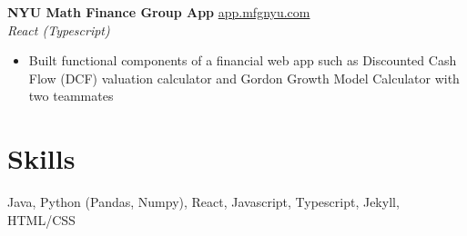 \documentclass[margin]{res}
\begin{document}
\begin{resume}
	{\bf NYU Math Finance Group App} \hfill\href{https://github.com/mfg-nyu/app}{app.mfgnyu.com}\\
	{\it React (Typescript)}
	\begin{itemize} \itemsep -2pt
		\item Built functional components of a financial web app such as Discounted Cash Flow (DCF) valuation calculator and Gordon Growth Model Calculator with two teammates
	\end{itemize}
	
	
	\section{Skills} 
	Java, Python (Pandas, Numpy), React, Javascript, Typescript, Jekyll, HTML/CSS
	
	
\end{resume} 
\end{document}
